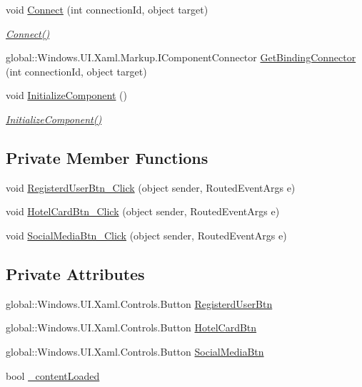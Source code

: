 \begin{DoxyCompactItemize}
void \hyperlink{class_eli_log_in_app_1_1_main_page_a91b51a574c226bfbec61f7deaba558e9}{Connect} (int connection\+Id, object target)
\begin{DoxyCompactList}\small\item\em \hyperlink{class_eli_log_in_app_1_1_main_page_a91b51a574c226bfbec61f7deaba558e9}{Connect()} \end{DoxyCompactList}\item 
global\+::\+Windows.\+U\+I.\+Xaml.\+Markup.\+I\+Component\+Connector \hyperlink{class_eli_log_in_app_1_1_main_page_a9737f0f488d2941971b9f597fcacef77}{Get\+Binding\+Connector} (int connection\+Id, object target)
\item 
void \hyperlink{class_eli_log_in_app_1_1_main_page_a7f0e43eb30fdabe71d3e986d17322783}{Initialize\+Component} ()
\begin{DoxyCompactList}\small\item\em \hyperlink{class_eli_log_in_app_1_1_main_page_a7f0e43eb30fdabe71d3e986d17322783}{Initialize\+Component()} \end{DoxyCompactList}\end{DoxyCompactItemize}
\subsection*{Private Member Functions}
\begin{DoxyCompactItemize}
\item 
void \hyperlink{class_eli_log_in_app_1_1_main_page_a030b7b47bfa76044573122a119b2e806}{Registerd\+User\+Btn\+\_\+\+Click} (object sender, Routed\+Event\+Args e)
\item 
void \hyperlink{class_eli_log_in_app_1_1_main_page_adbf51e02af6334d9bc1201f82c3ae5a2}{Hotel\+Card\+Btn\+\_\+\+Click} (object sender, Routed\+Event\+Args e)
\item 
void \hyperlink{class_eli_log_in_app_1_1_main_page_a30d3f1e55d03e84939ad086efccbdd7f}{Social\+Media\+Btn\+\_\+\+Click} (object sender, Routed\+Event\+Args e)
\end{DoxyCompactItemize}
\subsection*{Private Attributes}
\begin{DoxyCompactItemize}
\item 
global\+::\+Windows.\+U\+I.\+Xaml.\+Controls.\+Button \hyperlink{class_eli_log_in_app_1_1_main_page_a752bd2fc028b65302e3a541bc5aec220}{Registerd\+User\+Btn}
\item 
global\+::\+Windows.\+U\+I.\+Xaml.\+Controls.\+Button \hyperlink{class_eli_log_in_app_1_1_main_page_a23081fe4cde1cb18cc4ca7cfaf5b6809}{Hotel\+Card\+Btn}
\item 
global\+::\+Windows.\+U\+I.\+Xaml.\+Controls.\+Button \hyperlink{class_eli_log_in_app_1_1_main_page_a627384b98578fd8df066d5dfca6f1c4e}{Social\+Media\+Btn}
\item 
bool \hyperlink{class_eli_log_in_app_1_1_main_page_a305cbfd9033456ec39a30e3d4f92d921}{\+\_\+content\+Loaded}
\end{DoxyCompactItemize}


